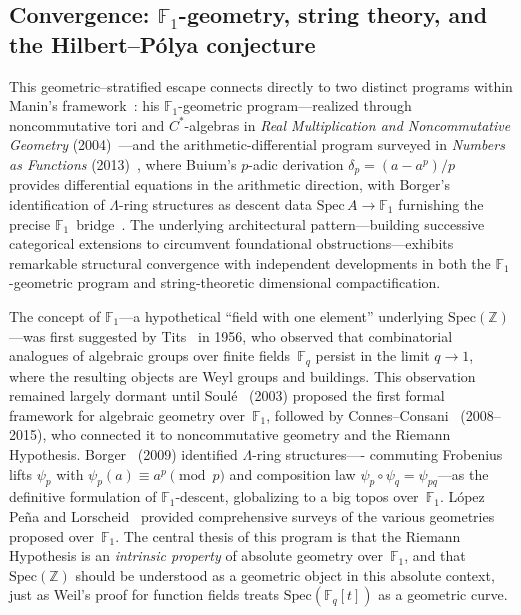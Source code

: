 \subsection{Convergence: \texorpdfstring{$\mathbb{F}_1$}{F1}-geometry, string theory,
and the Hilbert--P\'olya conjecture}\label{ssec:convergence}

This geometric--stratified escape connects directly to two distinct
programs within Manin's framework~\cite{manin13,manin04}: his
$\mathbb{F}_1$-geometric program---realized through noncommutative tori
and $C^*$-algebras in \emph{Real Multiplication and Noncommutative
Geometry} (2004)~\cite{manin04}---and the arithmetic-differential program
surveyed in \emph{Numbers as Functions} (2013)~\cite{manin13}, where
Buium's $p$-adic derivation $\delta_p = (a - a^p)/p$~\cite{buium05} provides
differential equations in the arithmetic direction, with Borger's
identification of $\Lambda$-ring structures as descent data
$\mathrm{Spec}\,A \to \mathbb{F}_1$ furnishing the precise
$\mathbb{F}_1$~bridge~\cite{borger09,borger11}.  The
underlying architectural pattern---building successive categorical
extensions to circumvent foundational obstructions---exhibits
remarkable structural convergence with independent developments in
both the $\mathbb{F}_1$-geometric program and string-theoretic
dimensional compactification.

The concept of $\mathbb{F}_1$---a hypothetical ``field with one
element'' underlying $\mathrm{Spec}(\mathbb{Z})$---was first suggested
by Tits~\cite{tits56} in 1956, who observed that combinatorial
analogues of algebraic groups over finite fields~$\mathbb{F}_q$ persist
in the limit $q \to 1$, where the resulting objects are Weyl groups and
buildings.  This observation remained largely dormant until
Soul\'e~\cite{soule03} (2003) proposed the first formal framework for
algebraic geometry over~$\mathbb{F}_1$, followed by
Connes--Consani~\cite{connes08} (2008--2015), who connected it
to noncommutative geometry and the Riemann Hypothesis.
Borger~\cite{borger09} (2009) identified $\Lambda$-ring structures----%
commuting Frobenius lifts $\psi_p$ with $\psi_p(a) \equiv a^p \pmod{p}$
and composition law $\psi_p \circ \psi_q = \psi_{pq}$---as the
definitive formulation of $\mathbb{F}_1$-descent, globalizing to a big
topos over~$\mathbb{F}_1$.  L\'opez Pe\~na and
Lorscheid~\cite{lopezpena09mapping} provided comprehensive surveys of the
various geometries proposed over~$\mathbb{F}_1$.  The central thesis of
this program is that the Riemann Hypothesis is an \emph{intrinsic
property} of absolute geometry over~$\mathbb{F}_1$, and that
$\mathrm{Spec}(\mathbb{Z})$ should be understood as a geometric object
in this absolute context, just as Weil's proof for function fields
treats $\mathrm{Spec}(\mathbb{F}_q[t])$ as a geometric curve.

